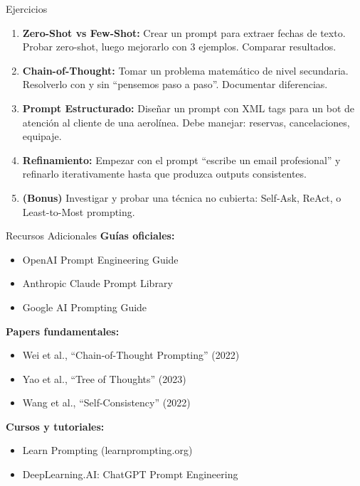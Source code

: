 \documentclass[aspectratio=169]{beamer}
\begin{document}
\begin{frame}{Ejercicios}
    \begin{enumerate}
        \setlength\itemsep{0.5em}
        \item \textbf{Zero-Shot vs Few-Shot:} Crear un prompt para extraer fechas de texto. Probar zero-shot, luego mejorarlo con 3 ejemplos. Comparar resultados.
        
        \item \textbf{Chain-of-Thought:} Tomar un problema matemático de nivel secundaria. Resolverlo con y sin ``pensemos paso a paso''. Documentar diferencias.
        
        \item \textbf{Prompt Estructurado:} Diseñar un prompt con XML tags para un bot de atención al cliente de una aerolínea. Debe manejar: reservas, cancelaciones, equipaje.
        
        \item \textbf{Refinamiento:} Empezar con el prompt ``escribe un email profesional'' y refinarlo iterativamente hasta que produzca outputs consistentes.
        
        \item \textbf{(Bonus)} Investigar y probar una técnica no cubierta: Self-Ask, ReAct, o Least-to-Most prompting.
    \end{enumerate}
\end{frame}

\begin{frame}{Recursos Adicionales}
    \textbf{Guías oficiales:}
    \begin{itemize}
        \item OpenAI Prompt Engineering Guide
        \item Anthropic Claude Prompt Library
        \item Google AI Prompting Guide
    \end{itemize}
    
    \vspace{0.3cm}
    \textbf{Papers fundamentales:}
    \begin{itemize}
        \item Wei et al., ``Chain-of-Thought Prompting'' (2022)
        \item Yao et al., ``Tree of Thoughts'' (2023)
        \item Wang et al., ``Self-Consistency'' (2022)
    \end{itemize}
    
    \vspace{0.3cm}
    \textbf{Cursos y tutoriales:}
    \begin{itemize}
        \item Learn Prompting (learnprompting.org)
        \item DeepLearning.AI: ChatGPT Prompt Engineering
    \end{itemize}
\end{frame}
\end{document}
